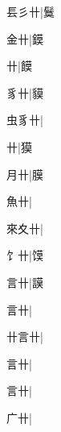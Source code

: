 \begin{multicols}{2}
{{\cjk{}镸彡卄}|{\cjk{}鬕}\par
{\cjk{}{\cnsym{}　}金卄}|{\cjk{}鏌}\par
{卄}|{\cjk{}饃}\par
{\cjk{}{\cnsym{}　}豸卄}|{\cjk{}貘}\par
{\cjk{}虫豸卄}|{}\par
{卄}|{\cjk{}獏}\par
{\cjk{}{\cnsym{}　}月卄}|{\cjk{}膜}\par
{\cjk{}{\cnsym{}　}魚卄}|{}\par
{\cjk{}來夊卄}|{}\par
{\cjk{}{\cnsym{}　}饣卄}|{\cjk{}馍}\par
{\cjk{}{\cnsym{}　}言卄}|{\cjk{}謨}\par
{言卄}|{}\par
{\cjk{}卄言卄}|{}\par
{言卄}|{}\par
{言卄}|{}\par
{\cjk{}{\cnsym{}　}广卄}|{}\par
}
\end{multicols}
